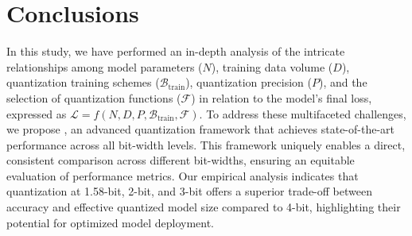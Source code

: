 \section{Conclusions}
\label{sec:conclusions}

In this study, we have performed an in-depth analysis of the intricate relationships among model parameters ($N$), training data volume ($D$), quantization training schemes ($\mathcal{B}_\text{train}$), quantization precision ($P$), and the selection of quantization functions ($\mathcal{F}$) in relation to the model's final loss, expressed as $\mathcal{L} = f(N, D, P, \mathcal{B}_\text{train}, \mathcal{F})$. To address these multifaceted challenges, we propose \ours{}, an advanced quantization framework that achieves state-of-the-art performance across all bit-width levels. This framework uniquely enables a direct, consistent comparison across different bit-widths, ensuring an equitable evaluation of performance metrics. Our empirical analysis indicates that quantization at 1.58-bit, 2-bit, and 3-bit offers a superior trade-off between accuracy and effective quantized model size compared to 4-bit, highlighting their potential for optimized model deployment.